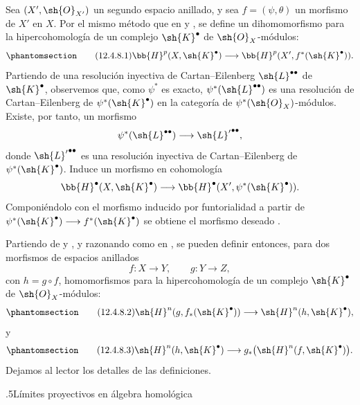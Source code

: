\documentclass[oneside]{amsart}
\makeatletter
\renewcommand*{\section}{%
  \@startsection{section}{1}{\z@}{.7\linespacing\@plus\linespacing}%
  {.5\linespacing}{\normalfont\bfseries\Large\scshape\centering}}
\let\EGAOriginalLabel\label
\renewcommand{\label}[1]{\phantomsection\EGAOriginalLabel{#1}}
\makeatother
\begin{document}
\begin{env}[12.4.8]
\label{0.12.4.8}
Sea $(X',\sh{O}_{X'})$ un segundo espacio anillado, y sea
$f=(\psi,\theta)$ un morfismo de $X'$ en $X$.
Por el mismo método que en  y , se
define un dihomomorfismo para la hipercohomología de un complejo
$\sh{K}^\bullet$ de $\sh{O}_X$-módulos:
\begin{equation}
\label{0.12.4.8.1}
\tag{12.4.8.1}
  \bb{H}^p(X,\sh{K}^\bullet)
  \longrightarrow
  \bb{H}^p(X',f^*(\sh{K}^\bullet)).
\end{equation}
Partiendo de una resolución inyectiva de Cartan--Eilenberg
$\sh{L}^{\bullet\bullet}$ de $\sh{K}^\bullet$, observemos que, como
$\psi^*$ es exacto, $\psi^*(\sh{L}^{\bullet\bullet})$ es una
resolución de Cartan--Eilenberg de $\psi^*(\sh{K}^\bullet)$ en la
categoría de $\psi^*(\sh{O}_X)$-módulos.
Existe, por tanto, un morfismo
\[
  \psi^*(\sh{L}^{\bullet\bullet})
  \longrightarrow
  {\sh{L}'}^{\bullet\bullet},
\]
donde ${\sh{L}'}^{\bullet\bullet}$ es una resolución inyectiva de
Cartan--Eilenberg de $\psi^*(\sh{K}^\bullet)$.
Induce un morfismo en cohomología
\[
  \bb{H}^\bullet(X,\sh{K}^\bullet)
  \longrightarrow
  \bb{H}^\bullet
  (X',\psi^*(\sh{K}^\bullet)).
\]
Componiéndolo con el morfismo inducido por funtorialidad a partir de
$\psi^*(\sh{K}^\bullet)\longrightarrow f^*(\sh{K}^\bullet)$ se obtiene
el morfismo deseado .

Partiendo de  y , y razonando como
en , se pueden definir entonces, para dos morfismos de
espacios anillados
\[
  f:X\longrightarrow Y,
  \qquad
  g:Y\longrightarrow Z,
\]
con $h=g\circ f$, homomorfismos para la hipercohomología de un complejo
$\sh{K}^\bullet$ de $\sh{O}_X$-módulos:
\begin{equation}
\label{0.12.4.8.2}
\tag{12.4.8.2}
  \sh{H}^n(g,f_*(\sh{K}^\bullet))
  \longrightarrow
  \sh{H}^n(h,\sh{K}^\bullet),
\end{equation}
y
\begin{equation}
\label{0.12.4.8.3}
\tag{12.4.8.3}
  \sh{H}^n(h,\sh{K}^\bullet)
  \longrightarrow
  g_*\bigl(\sh{H}^n(f,\sh{K}^\bullet)\bigr).
\end{equation}
Dejamos al lector los detalles de las definiciones.
\end{env}

\section{Límites proyectivos en álgebra homológica}
\label{section:0.13}
\end{document}
